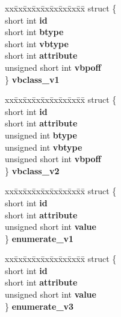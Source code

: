\begin{DoxyCompactItemize}
\begin{tabbing}
\end{tabbing}\item 
\mbox{\label{unioncodeview__fieldtype_a0ab192f865582394cc9bf33b549fdd29}} 
\begin{tabbing}
xx\=xx\=xx\=xx\=xx\=xx\=xx\=xx\=xx\=\kill
struct \{\\
\>short int {\bfseries id}\\
\>short int {\bfseries btype}\\
\>short int {\bfseries vbtype}\\
\>short int {\bfseries attribute}\\
\>unsigned short int {\bfseries vbpoff}\\
\} {\bfseries vbclass\_v1}\\

\end{tabbing}\item 
\mbox{\label{unioncodeview__fieldtype_ab3b5d415480c96ef02dc4c42fc418ab2}} 
\begin{tabbing}
xx\=xx\=xx\=xx\=xx\=xx\=xx\=xx\=xx\=\kill
struct \{\\
\>short int {\bfseries id}\\
\>short int {\bfseries attribute}\\
\>unsigned int {\bfseries btype}\\
\>unsigned int {\bfseries vbtype}\\
\>unsigned short int {\bfseries vbpoff}\\
\} {\bfseries vbclass\_v2}\\

\end{tabbing}\item 
\mbox{\label{unioncodeview__fieldtype_adc34c00394ea7a14be13723163b2afef}} 
\begin{tabbing}
xx\=xx\=xx\=xx\=xx\=xx\=xx\=xx\=xx\=\kill
struct \{\\
\>short int {\bfseries id}\\
\>short int {\bfseries attribute}\\
\>unsigned short int {\bfseries value}\\
\} {\bfseries enumerate\_v1}\\

\end{tabbing}\item 
\mbox{\label{unioncodeview__fieldtype_a42c031490421514e554324b7434223b0}} 
\begin{tabbing}
xx\=xx\=xx\=xx\=xx\=xx\=xx\=xx\=xx\=\kill
struct \{\\
\>short int {\bfseries id}\\
\>short int {\bfseries attribute}\\
\>unsigned short int {\bfseries value}\\
\} {\bfseries enumerate\_v3}\\


\end{tabbing}
\end{DoxyCompactItemize}
